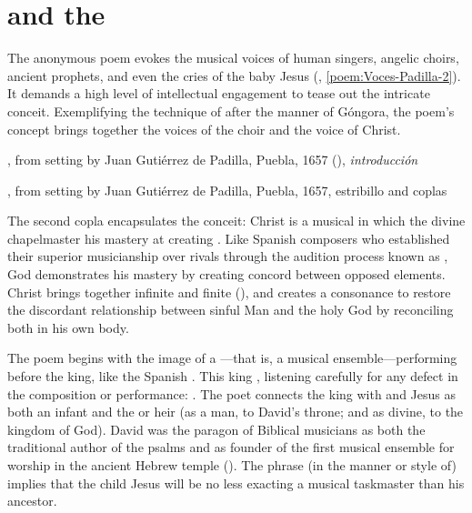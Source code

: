 \section{ and the }

The anonymous poem evokes the musical voices of human singers, angelic choirs,
ancient prophets, and even the cries of the baby Jesus
(, \ref{poem:Voces-Padilla-2}).%
    \Autocite[37--38, 119--132]{Cashner:WLSCM32}
It demands a high level of intellectual engagement to tease out the intricate
conceit.
Exemplifying the technique of  after the manner of Góngora,
the poem's concept brings together the voices of the choir and the voice of
Christ.


{, from setting by Juan Gutiérrez
de Padilla, Puebla, 1657 (), \emph{introducción}}

{, from setting by Juan Gutiérrez de Padilla,
Puebla, 1657, estribillo and coplas}

The second copla encapsulates the conceit: Christ is a musical
 in which the divine chapelmaster  his
mastery at creating .
Like Spanish composers who established their superior musicianship over rivals
through the audition process known as , God demonstrates his
mastery by creating concord between opposed elements.
Christ brings together infinite and finite (), and
creates a consonance to restore the discordant relationship between sinful Man
and the holy God by reconciling both in his own body.


The poem begins with the image of a ---that is, a musical
ensemble---performing before the king, like the Spanish .
This king , listening carefully for any defect in the
composition or performance: .
The poet connects the king with  and Jesus
as both an infant and the  or heir (as a man, to David's throne;
and as divine, to the kingdom of God).
David was the paragon of Biblical musicians as both the traditional author of
the psalms and as founder of the first musical ensemble for worship in the
ancient Hebrew temple ().
The phrase  (in the manner or style of) implies that the
child Jesus will be no less exacting a musical taskmaster than his ancestor.

